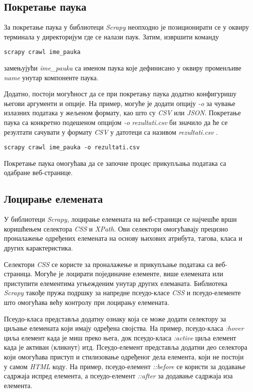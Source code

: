 \documentclass[12pt,oneside]{memoir}
\begin{document}
\subsection{Покретање паука}
За покретање паука у библиотеци \textit{Scrapy} неопходно је позиционирати се у оквиру терминала у директоријум где се налази паук. Затим, извршити команду
\begin{verbatim}
scrapy crawl ime_pauka
\end{verbatim}
замењујући \textit{ime\_pauka} са именом паука које дефинисано у оквиру променљиве \textit{name} унутар компоненте паука. 

Додатно, постоји могућност да се при покретању паука додатно конфигуришу његови аргументи и опције. На пример, могуће је додати опцију \textit{-o} за чување излазних података у жељеном формату, као што су \textit{CSV} или \textit{JSON}. Покретање паука са конкретно подешеном опцијом \textit{-o} \textit{rezultati.csv} би значило да ће се резултати сачувати у формату \textit{CSV} у датотеци са називом \textit{rezultati.csv} \cite{WebScrapingWithPython}. 
\begin{verbatim}
scrapy crawl ime_pauka -o rezultati.csv
\end{verbatim}

Покретање паука омогућава да се започне процес прикупљања података са одабране веб-странице.

\subsection{Лоцирање елемената}
У библиотеци \textit{Scrapy}, лоцирање елемената на веб-страници се најчешће врши коришћењем селектора \textit{CSS} и \textit{XPath}. Ови селектори омогућавају прецизно проналажење одређених елемената на основу њихових атрибута, тагова, класа и других карактеристика.

Селектори \textit{CSS} се користе за проналажење и прикупљање података са веб-страница. Могуће је лоцирати појединачне елементе, више елемената или приступити елементима угњежденим унутар других елеманата. Библиотека \textit{Scrapy} такође пружа подршку за напредне псеудо-класе \textit{CSS} и псеудо-елементе што омогућава већу контролу при лоцирању елемената.

Псеудо-класа представља додатну ознаку која се може додати селектору за циљање елемената који имају одређена својства. На пример, псеудо-класа \textit{:hover} циља елемент када је миш преко њега, док псеудо-класа \textit{:active} циља елемент када је активан (кликнут) итд. Псеудо-елемент представља додатни део селектора који омогућава приступ и стилизовање одређеног дела елемента, који не постоји у самом  \textit{HTML} коду. На пример, псеудо-елемент \textit{::before} се користи за додавање садржаја испред елемента, а псеудо-елемент \textit{::after} за додавање садржаја иза елемента.
\end{document}
